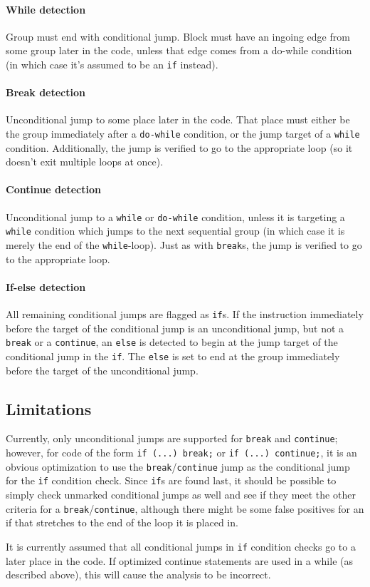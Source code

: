 \paragraph{While detection}
Group must end with conditional jump. Block must have an ingoing edge from some group later in the code, unless that edge comes from a do-while condition (in which case it's assumed to be an \verb+if+ instead).

\paragraph{Break detection}
Unconditional jump to some place later in the code. That place must either be the group immediately after a \verb+do-while+ condition, or the jump target of a \verb+while+ condition. Additionally, the jump is verified to go to the appropriate loop (so it doesn't exit multiple loops at once).

\paragraph{Continue detection}
Unconditional jump to a \verb+while+ or \verb+do-while+ condition, unless it is targeting a \verb+while+ condition which jumps to the next sequential group (in which case it is merely the end of the \verb+while+-loop). Just as with \verb+break+s, the jump is verified to go to the appropriate loop.

\paragraph{If-else detection}
All remaining conditional jumps are flagged as \verb+if+s. If the instruction immediately before the target of the conditional jump is an unconditional jump, but not a \verb+break+ or a \verb+continue+, an \verb+else+ is detected to begin at the jump target of the conditional jump in the \verb+if+. The \verb+else+ is set to end at the group immediately before the target of the unconditional jump.

\subsection{Limitations}
Currently, only unconditional jumps are supported for \verb+break+ and \verb+continue+; however, for code of the form \verb+if (...) break;+ or \verb+if (...) continue;+, it is an obvious optimization to use the \verb+break+/\verb+continue+ jump as the conditional jump for the \verb+if+ condition check. Since \verb+if+s are found last, it should be possible to simply check unmarked conditional jumps as well and see if they meet the other criteria for a \verb+break+/\verb+continue+, although there might be some false positives for an if that stretches to the end of the loop it is placed in.

It is currently assumed that all conditional jumps in \verb+if+ condition checks go to a later place in the code. If optimized continue statements are used in a while (as described above), this will cause the analysis to be incorrect.
